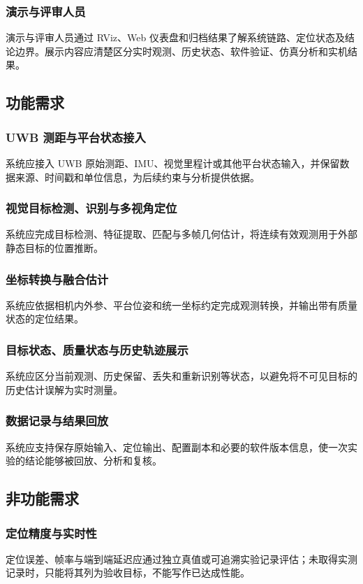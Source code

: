\documentclass[UTF8,a4paper,12pt]{ctexart}
\begin{document}
\subsubsection{演示与评审人员}
演示与评审人员通过 RViz、Web 仪表盘和归档结果了解系统链路、定位状态及结论边界。展示内容应清楚区分实时观测、历史状态、软件验证、仿真分析和实机结果。

\subsection{功能需求}
\subsubsection{UWB 测距与平台状态接入}
系统应接入 UWB 原始测距、IMU、视觉里程计或其他平台状态输入，并保留数据来源、时间戳和单位信息，为后续约束与分析提供依据。

\subsubsection{视觉目标检测、识别与多视角定位}
系统应完成目标检测、特征提取、匹配与多帧几何估计，将连续有效观测用于外部静态目标的位置推断。

\subsubsection{坐标转换与融合估计}
系统应依据相机内外参、平台位姿和统一坐标约定完成观测转换，并输出带有质量状态的定位结果。

\subsubsection{目标状态、质量状态与历史轨迹展示}
系统应区分当前观测、历史保留、丢失和重新识别等状态，以避免将不可见目标的历史估计误解为实时测量。

\subsubsection{数据记录与结果回放}
系统应支持保存原始输入、定位输出、配置副本和必要的软件版本信息，使一次实验的结论能够被回放、分析和复核。

\subsection{非功能需求}
\subsubsection{定位精度与实时性}
定位误差、帧率与端到端延迟应通过独立真值或可追溯实验记录评估；未取得实测记录时，只能将其列为验收目标，不能写作已达成性能。
\end{document}
